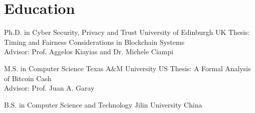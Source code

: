 \section{Education}

{Ph.D. in Cyber Security, Privacy and Trust}
{University of Edinburgh}
{}
{UK}
{Thesis: Timing and Fairness Considerations in Blockchain Systems\\Advisor: Prof. Aggelos Kiayias and Dr. Michele Ciampi}

{M.S. in Computer Science}
{Texas A\&M University}
{}
{US}
{Thesis: A Formal Analysis of Bitcoin Cash \\Advisor: Prof. Juan A. Garay}

{B.S. in Computer Science and Technology}
{Jilin University}
{}
{China}
{}
